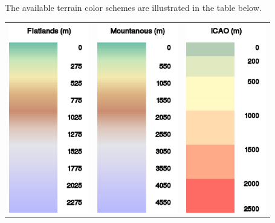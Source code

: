 \documentclass[a4paper,12pt]{refrep}
\begin{document}
\begin{maxipage}
The available terrain color schemes are illustrated in the table below.

\begin{longtable}{c c c}
\includegraphics[angle=0,width=3.5cm,keepaspectratio='true']{figures/ramp-terrain-flatlands.png}&

\includegraphics[angle=0,width=3.5cm,keepaspectratio='true']{figures/ramp-terrain-mountanous.png}&

\includegraphics[angle=0,width=3.5cm,keepaspectratio='true']{figures/ramp-terrain-icao.png}\\


\end{longtable}
\end{maxipage}
\end{document}
